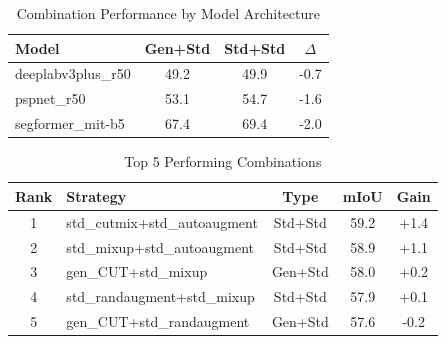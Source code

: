 \begin{table}[htbp]
\centering
\caption{Combination Performance by Model Architecture}
\label{tab:model_combination}
\begin{tabular}{lccc}
\toprule
Model & Gen+Std & Std+Std & $\Delta$ \\
\midrule
deeplabv3plus_r50 & 49.2 & 49.9 & -0.7 \\
pspnet_r50 & 53.1 & 54.7 & -1.6 \\
segformer_mit-b5 & 67.4 & 69.4 & -2.0 \\
\bottomrule
\end{tabular}
\end{table}

\begin{table}[htbp]
\centering
\caption{Top 5 Performing Combinations}
\label{tab:top5_combinations}
\begin{tabular}{clccc}
\toprule
Rank & Strategy & Type & mIoU & Gain \\
\midrule
1 & std_cutmix+std_autoaugment & Std+Std & 59.2 & +1.4 \\
2 & std_mixup+std_autoaugment & Std+Std & 58.9 & +1.1 \\
3 & gen_CUT+std_mixup & Gen+Std & 58.0 & +0.2 \\
4 & std_randaugment+std_mixup & Std+Std & 57.9 & +0.1 \\
5 & gen_CUT+std_randaugment & Gen+Std & 57.6 & -0.2 \\
\bottomrule
\end{tabular}
\end{table}